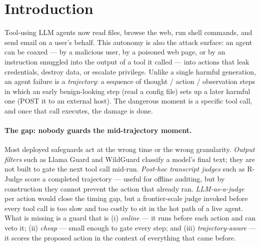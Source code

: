 \section{Introduction}
\label{sec:intro}

Tool-using LLM agents now read files, browse the web, run shell commands, and
send email on a user's behalf. This autonomy is also the attack surface: an
agent can be coaxed --- by a malicious user, by a poisoned web page, or by an
instruction smuggled into the output of a tool it called --- into actions that
leak credentials, destroy data, or escalate privilege. Unlike a single harmful
generation, an agent failure is a \emph{trajectory}: a sequence of
thought / action / observation steps in which an early benign-looking step
(read a config file) sets up a later harmful one (POST it to an external host).
The dangerous moment is a specific tool call, and once that call executes, the
damage is done.

\paragraph{The gap: nobody guards the mid-trajectory moment.}
Most deployed safeguards act at the wrong time or the wrong granularity.
\emph{Output filters} such as Llama Guard \citep{llamaguard} and WildGuard
\citep{wildguard} classify a model's final text; they are not built to gate the
next tool call mid-run. \emph{Post-hoc transcript judges} such as R-Judge
\citep{rjudge} score a completed trajectory --- useful for offline auditing, but
by construction they cannot prevent the action that already ran.
\emph{LLM-as-a-judge} per action would close the timing gap, but a frontier-scale
judge invoked before every tool call is too slow and too costly to sit in the
hot path of a live agent. What is missing is a guard that is (i) \emph{online}
--- it runs before each action and can veto it; (ii) \emph{cheap} --- small
enough to gate every step; and (iii) \emph{trajectory-aware} --- it scores the
proposed action in the context of everything that came before.

